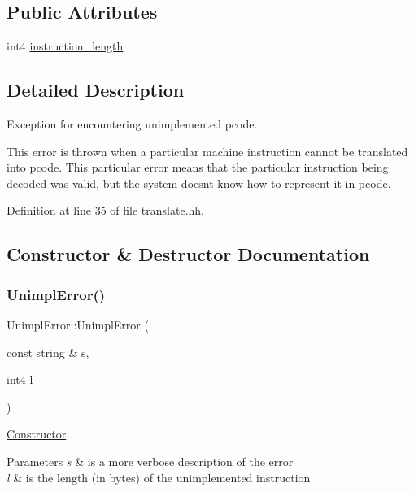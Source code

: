 \subsection*{Public Attributes}
\begin{DoxyCompactItemize}
\item 
int4 \mbox{\hyperlink{struct_unimpl_error_aa20932cfe081be954491dad23f4f056e}{instruction\+\_\+length}}
\end{DoxyCompactItemize}


\subsection{Detailed Description}
Exception for encountering unimplemented pcode. 

This error is thrown when a particular machine instruction cannot be translated into pcode. This particular error means that the particular instruction being decoded was valid, but the system doesn\textquotesingle{}t know how to represent it in pcode. 

Definition at line 35 of file translate.\+hh.



\subsection{Constructor \& Destructor Documentation}
\mbox{\label{struct_unimpl_error_aeb883947877420388b4bd020074b2569}} 
\subsubsection{\texorpdfstring{UnimplError()}{UnimplError()}}
{\footnotesize\ttfamily Unimpl\+Error\+::\+Unimpl\+Error (\begin{DoxyParamCaption}\item[{const string \&}]{s,  }\item[{int4}]{l }\end{DoxyParamCaption})\hspace{0.3cm}{\ttfamily [inline]}}



\mbox{\hyperlink{class_constructor}{Constructor}}. 


\begin{DoxyParams}{Parameters}
{\em s} & is a more verbose description of the error \\
\hline
{\em l} & is the length (in bytes) of the unimplemented instruction \\
\hline
\end{DoxyParams}


